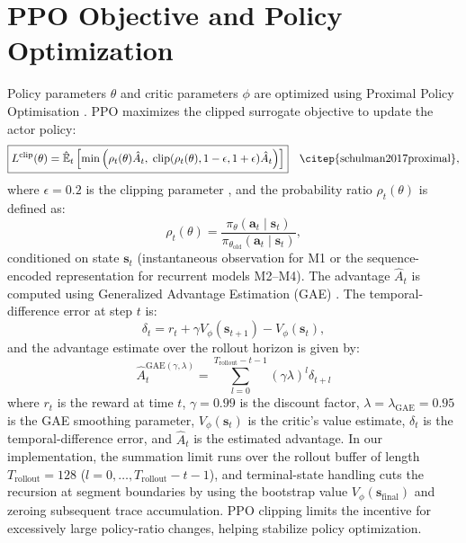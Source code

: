 \section{PPO Objective and Policy Optimization}
Policy parameters $\theta$ and critic parameters $\phi$ are optimized using Proximal Policy Optimisation \citep{schulman2017proximal}. PPO maximizes the clipped surrogate objective to update the actor policy:
\begin{equation}
\boxed{
L^{\text{clip}}(\theta) = \hat{\mathbb{E}}_t \left[ \min\left( \rho_t(\theta) \hat{A}_t, \; \operatorname{clip}(\rho_t(\theta), 1-\epsilon, 1+\epsilon) \hat{A}_t \right) \right]
} \quad \text{\citep{schulman2017proximal}},
\label{eq:lclip}
\end{equation}
where $\epsilon = 0.2$ is the clipping parameter \citep{schulman2017proximal, zou2024novel}, and the probability ratio $\rho_t(\theta)$ is defined as:
\begin{equation}
\rho_t(\theta) = \frac{\pi_\theta(\mathbf{a}_t \mid \mathbf{s}_t)}{\pi_{\theta_{\text{old}}}(\mathbf{a}_t \mid \mathbf{s}_t)},
\end{equation}
conditioned on state $\mathbf{s}_t$ (instantaneous observation for M1 or the sequence-encoded representation for recurrent models M2--M4). The advantage $\hat{A}_t$ is computed using Generalized Advantage Estimation (GAE) \citep{schulman2016high}. The temporal-difference error at step $t$ is:
\begin{equation}
\delta_t = r_t + \gamma V_\phi(\mathbf{s}_{t+1}) - V_\phi(\mathbf{s}_t),
\end{equation}
and the advantage estimate over the rollout horizon is given by:
\begin{equation}
\boxed{
\hat{A}_t^{\text{GAE}(\gamma, \lambda)} = \sum_{l=0}^{T_{\text{rollout}} - t - 1} (\gamma \lambda)^l \delta_{t+l}
}
\end{equation}
where $r_t$ is the reward at time $t$, $\gamma = 0.99$ is the discount factor, $\lambda = \lambda_{\text{GAE}} = 0.95$ is the GAE smoothing parameter, $V_\phi(\mathbf{s}_t)$ is the critic's value estimate, $\delta_t$ is the temporal-difference error, and $\hat{A}_t$ is the estimated advantage. In our implementation, the summation limit runs over the rollout buffer of length $T_{\text{rollout}} = 128$ ($l = 0, \dots, T_{\text{rollout}}-t-1$), and terminal-state handling cuts the recursion at segment boundaries by using the bootstrap value $V_\phi(\mathbf{s}_{\text{final}})$ and zeroing subsequent trace accumulation. PPO clipping limits the incentive for excessively large policy-ratio changes, helping stabilize policy optimization.

